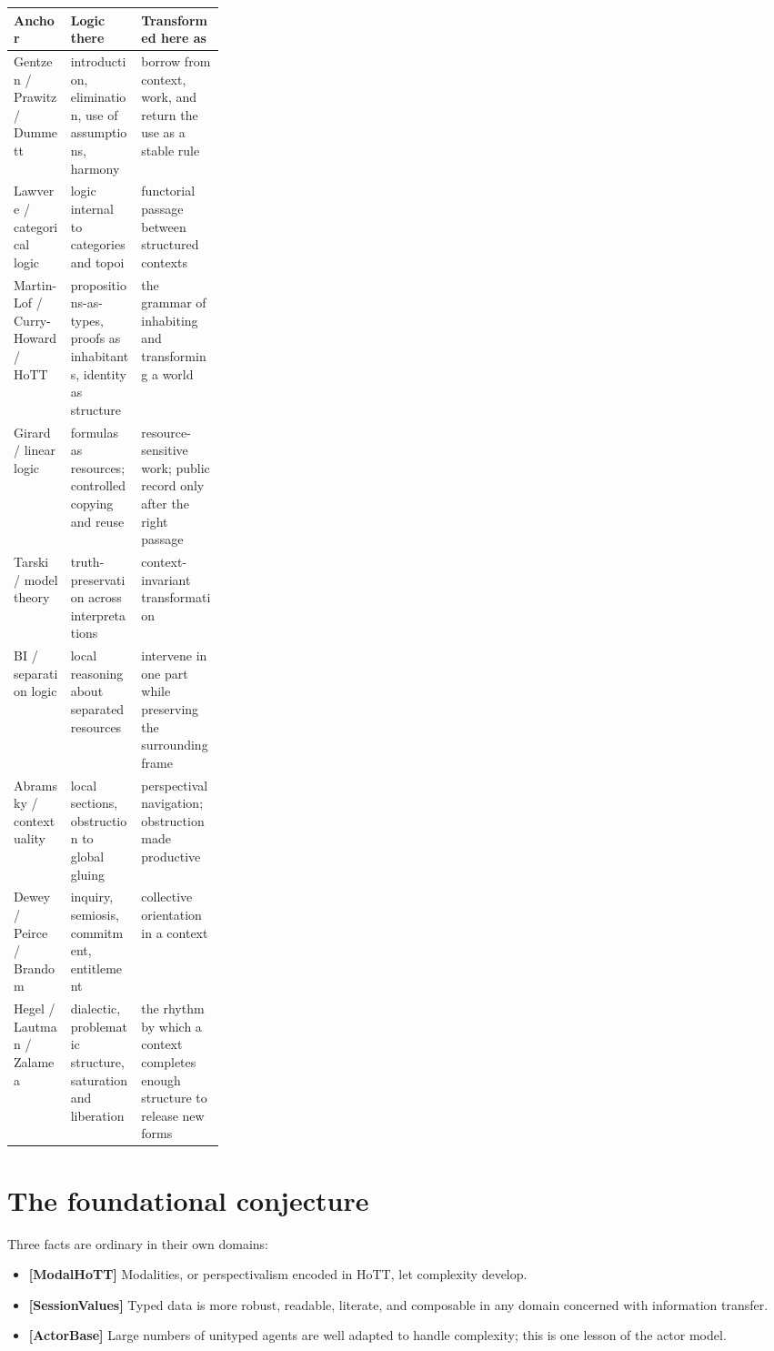 \documentclass[11pt]{article}
\begin{document}
\begin{table}[H]
\small
\setlength{\tabcolsep}{5pt}
\renewcommand{\arraystretch}{1.18}
\begin{tabularx}{\linewidth}{@{}p{0.27\linewidth}Y Y@{}}
\toprule
Anchor & Logic there & Transformed here as \\
\midrule
Gentzen / Prawitz / Dummett &
introduction, elimination, use of assumptions, harmony &
borrow from context, work, and return the use as a stable rule \\
\addlinespace
Lawvere / categorical logic &
logic internal to categories and topoi &
functorial passage between structured contexts \\
\addlinespace
Martin-Lof / Curry-Howard / HoTT &
propositions-as-types, proofs as inhabitants, identity as structure &
the grammar of inhabiting and transforming a world \\
\addlinespace
Girard / linear logic &
formulas as resources; controlled copying and reuse &
resource-sensitive work; public record only after the right passage \\
\addlinespace
Tarski / model theory &
truth-preservation across interpretations &
context-invariant transformation \\
\addlinespace
BI / separation logic &
local reasoning about separated resources &
intervene in one part while preserving the surrounding frame \\
\addlinespace
Abramsky / contextuality &
local sections, obstruction to global gluing &
perspectival navigation; obstruction made productive \\
\addlinespace
Dewey / Peirce / Brandom &
inquiry, semiosis, commitment, entitlement &
collective orientation in a context \\
\addlinespace
Hegel / Lautman / Zalamea &
dialectic, problematic structure, saturation and liberation &
the rhythm by which a context completes enough structure to release new forms \\
\bottomrule
\end{tabularx}
\end{table}

\section{The foundational conjecture}

Three facts are ordinary in their own domains:

\begin{itemize}
\item \textbf{[ModalHoTT]} Modalities, or perspectivalism encoded in HoTT, let
complexity develop.
\item \textbf{[SessionValues]} Typed data is more robust, readable, literate,
and composable in any domain concerned with information transfer.
\item \textbf{[ActorBase]} Large numbers of unityped agents are well adapted to
handle complexity; this is one lesson of the actor model.
\end{itemize}
\end{document}

